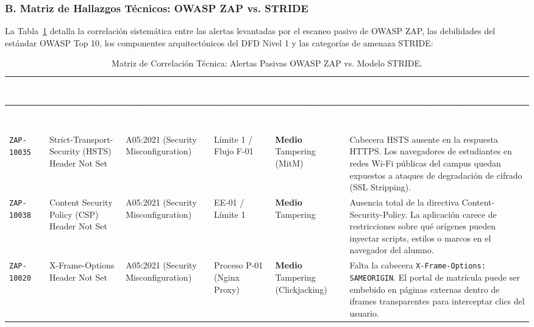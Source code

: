 \subsubsection{B. Matriz de Hallazgos Técnicos: OWASP ZAP vs. STRIDE}
La Tabla~\ref{tab:owasp_zap_stride} detalla la correlación sistemática entre las alertas levantadas por el escaneo pasivo de OWASP ZAP, las debilidades del estándar OWASP Top 10, los componentes arquitectónicos del DFD Nivel 1 y las categorías de amenaza STRIDE:

\begingroup
\setlength{\tabcolsep}{2.5pt}
\scriptsize
\begin{longtable}{p{1.5cm} p{2.4cm} p{2.1cm} p{1.8cm} >{\centering\arraybackslash}p{1.6cm} p{4.2cm}}
\caption{Matriz de Correlación Técnica: Alertas Pasivas OWASP ZAP vs. Modelo STRIDE.} \label{tab:owasp_zap_stride} \\
\toprule
\rowcolor{fg}
\textcolor{white}{Alerta ZAP} & \textcolor{white}{Regla OWASP} & \textcolor{white}{OWASP Top 10} & \textcolor{white}{Elemento DFD} & \textcolor{white}{Nivel / STRIDE} & \textcolor{white}{Evidencia y Brecha Técnica Detectada} \\
\midrule
\endfirsthead
\toprule
\rowcolor{fg}
\textcolor{white}{Alerta ZAP} & \textcolor{white}{Regla OWASP} & \textcolor{white}{OWASP Top 10} & \textcolor{white}{Elemento DFD} & \textcolor{white}{Nivel / STRIDE} & \textcolor{white}{Evidencia y Brecha Técnica Detectada} \\
\midrule
\endhead
\bottomrule
\endfoot
\texttt{ZAP-10035} & Strict-Transport-Security (HSTS) Header Not Set & A05:2021 (Security Misconfiguration) & Límite 1 / Flujo F-01 & \textbf{Medio} \newline Tampering (MitM) & Cabecera HSTS ausente en la respuesta HTTPS. Los navegadores de estudiantes en redes Wi-Fi públicas del campus quedan expuestos a ataques de degradación de cifrado (SSL Stripping). \\ \midrule
\texttt{ZAP-10038} & Content Security Policy (CSP) Header Not Set & A05:2021 (Security Misconfiguration) & EE-01 / Límite 1 & \textbf{Medio} \newline Tampering & Ausencia total de la directiva Content-Security-Policy. La aplicación carece de restricciones sobre qué orígenes pueden inyectar scripts, estilos o marcos en el navegador del alumno. \\ \midrule
\texttt{ZAP-10020} & X-Frame-Options Header Not Set & A05:2021 (Security Misconfiguration) & Proceso P-01 (Nginx Proxy) & \textbf{Medio} \newline Tampering (Clickjacking) & Falta la cabecera \texttt{X-Frame-Options: SAMEORIGIN}. El portal de matrícula puede ser embebido en páginas externas dentro de iframes transparentes para interceptar clics del usuario. \\ \midrule

\end{longtable}
